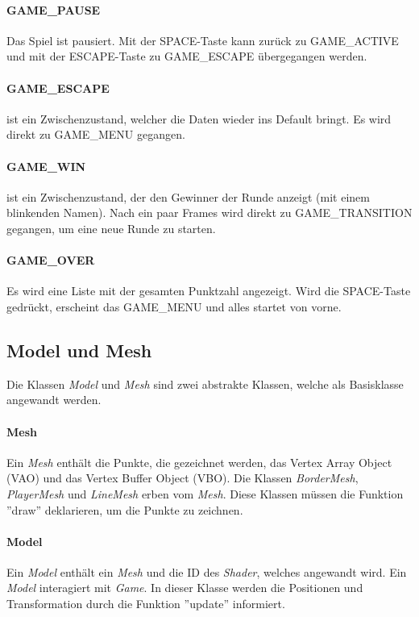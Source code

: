 \documentclass[doktyp=studarbeit]{TUBAFarbeiten}
\begin{document}
\paragraph{GAME\_PAUSE}
Das Spiel ist pausiert. Mit der SPACE-Taste kann zurück zu GAME\_ACTIVE 
und mit der ESCAPE-Taste zu GAME\_ESCAPE übergegangen werden.
\paragraph{GAME\_ESCAPE}
ist ein Zwischenzustand, welcher die Daten wieder ins Default 
bringt. Es wird direkt zu GAME\_MENU gegangen.
\paragraph{GAME\_WIN}
ist ein Zwischenzustand, der den Gewinner der Runde anzeigt 
(mit einem blinkenden Namen).
Nach ein paar Frames wird direkt zu GAME\_TRANSITION gegangen, um eine 
neue Runde zu starten. 
\paragraph{GAME\_OVER}
Es wird eine Liste mit der gesamten Punktzahl angezeigt. Wird die SPACE-Taste
gedrückt, erscheint das GAME\_MENU und alles startet von vorne.

\subsection{Model und Mesh}
Die Klassen \textit{Model} und \textit{Mesh} sind zwei abstrakte Klassen, welche
als Basisklasse angewandt werden.

\paragraph{Mesh} 
Ein \textit{Mesh} enthält die Punkte, die gezeichnet werden, das 
Vertex Array Object (VAO) und das Vertex Buffer Object (VBO). 
Die Klassen \textit{BorderMesh}, \textit{PlayerMesh} und \textit{LineMesh} 
erben vom \textit{Mesh}. Diese Klassen müssen die Funktion ''draw'' deklarieren,
um die Punkte zu zeichnen.

\paragraph{Model} 
Ein \textit{Model} enthält ein \textit{Mesh} und die ID des \textit{Shader},
welches angewandt wird. Ein \textit{Model} interagiert mit \textit{Game}. In
dieser Klasse werden die Positionen und Transformation durch die Funktion 
''update'' informiert.
\end{document}
